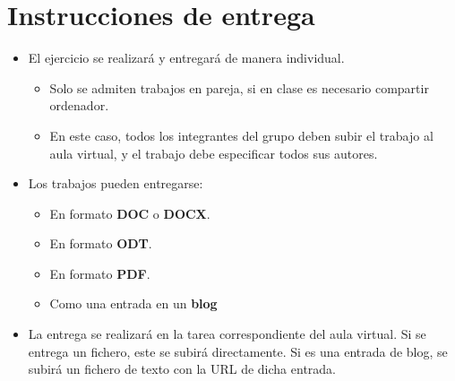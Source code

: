 \section{Instrucciones de entrega}
\begin{itemize}
\item El ejercicio se realizará y entregará de manera individual.
  \begin{itemize}
  \item Solo se admiten trabajos en pareja, si en clase es necesario compartir ordenador.
  \item En este caso, todos los integrantes del grupo deben subir el trabajo al aula virtual, y el trabajo debe especificar todos sus autores.
  \end{itemize}

\item Los trabajos pueden entregarse:
  \begin{itemize}
  \item En formato \textbf{DOC} o \textbf{DOCX}.
  \item En formato \textbf{ODT}.
  \item En formato \textbf{PDF}. 
  \item Como una entrada en un \textbf{blog} 

  \end{itemize}
  
\item La entrega se realizará en la tarea correspondiente del aula virtual. Si se entrega un fichero, este se subirá directamente. Si es una entrada de blog, se subirá un fichero de texto con la URL de dicha entrada.
\end{itemize}  





